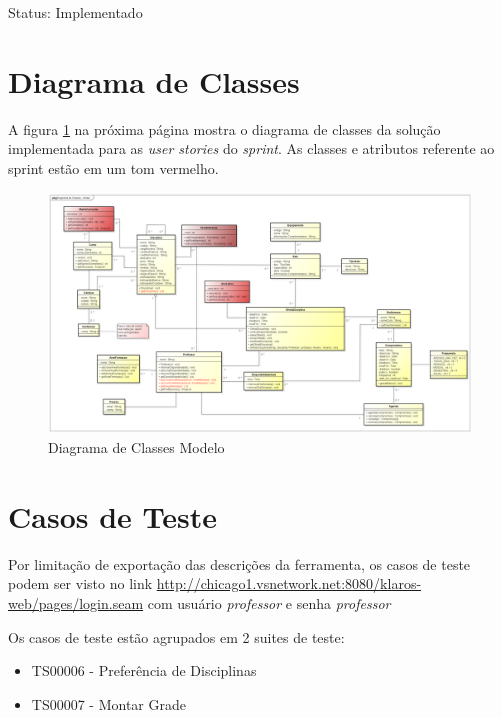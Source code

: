 \documentclass{abnt}
\begin{document}
			Status: Implementado
			
		
	\clearpage
	
	
		\section{Diagrama de Classes}
		
			A figura \ref{fig:DiagramaClassesModelo} na próxima página mostra o diagrama de classes da solução implementada para as \emph{user stories} do \emph{sprint}. As classes e atributos referente ao sprint estão em um tom vermelho.
			
					 \begin{landscape}
					 			\begin{figure}[htp]
					 				\begin{center}
					 					 \includegraphics[width=600px]{DiagramaClassesModelo}
					 					 \caption{Diagrama de Classes Modelo}
					 					 \label{fig:DiagramaClassesModelo}
					 				\end{center}
					 			\end{figure}
					 		\end{landscape}
			
	
		\section{Casos de Teste}
		
		 Por limitação de exportação das descrições da ferramenta, os casos de teste podem ser visto no link \url{http://chicago1.vsnetwork.net:8080/klaros-web/pages/login.seam} com usuário \emph{professor} e senha \emph{professor}
		 
		 Os casos de teste estão agrupados em 2 suites de teste:
		 \begin{itemize}
		 \item TS00006 - Preferência de Disciplinas
		 \item TS00007 - Montar Grade
		 \end{itemize}
		 
\end{document}
